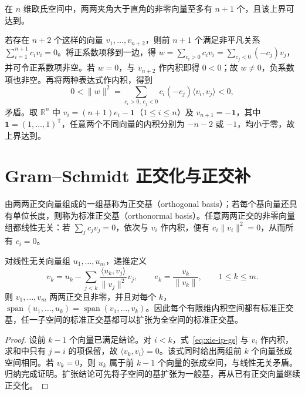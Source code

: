 \begin{example}
在 $n$ 维欧氏空间中，两两夹角大于直角的非零向量至多有 $n+1$ 个，且该上界可达到。
\end{example}
\begin{solve}
若存在 $n+2$ 个这样的向量 $v_1,\ldots,v_{n+2}$，则前 $n+1$ 个满足非平凡关系 $\sum_{i=1}^{n+1}c_iv_i=0$。将正系数项移到一边，得 $w=\sum_{c_i>0}c_iv_i=\sum_{c_j<0}(-c_j)v_j$，并可令正系数项非空。若 $w=0$，与 $v_{n+2}$ 作内积即得 $0<0$；故 $w\ne0$，负系数项也非空。再将两种表达式作内积，得到
\[
0<\|w\|^2=\sum_{c_i>0,\,c_j<0}c_i(-c_j)\langle v_i,v_j\rangle<0,
\]
矛盾。取 $\mathbb R^n$ 中 $v_i=(n+1)e_i-\boldsymbol1$（$1\leq i\leq n$）及 $v_{n+1}=-\boldsymbol1$，其中 $\boldsymbol1=(1,\ldots,1)^{\mathsf T}$，任意两个不同向量的内积分别为 $-n-2$ 或 $-1$，均小于零，故上界达到。
\end{solve}

\section{Gram--Schmidt 正交化与正交补}
\label{sec:xie-ip-orthogonalization}

\begin{definition}
由两两正交向量组成的一组基称为正交基（orthogonal basis）；若每个基向量还具有单位长度，则称为标准正交基（orthonormal basis）。任意两两正交的非零向量组都线性无关：若 $\sum_jc_jv_j=0$，依次与 $v_i$ 作内积，便有 $c_i\|v_i\|^2=0$，从而所有 $c_i=0$。
\end{definition}

\begin{theorem}
\label{thm:xie-ip-gs}
对线性无关向量组 $u_1,\ldots,u_m$，递推定义
\begin{equation}
\label{eq:xie-ip-gs}
v_k=u_k-\sum_{j<k}\frac{\langle u_k,v_j\rangle}{\|v_j\|^2}v_j,
\qquad e_k=\frac{v_k}{\|v_k\|},\qquad 1\leq k\leq m.
\end{equation}
则 $v_1,\ldots,v_m$ 两两正交且非零，并且对每个 $k$，$\operatorname{span}(u_1,\ldots,u_k)=\operatorname{span}(v_1,\ldots,v_k)$。因此每个有限维内积空间都有标准正交基，任一子空间的标准正交基都可以扩张为全空间的标准正交基。
\end{theorem}
\begin{proof}
设前 $k-1$ 个向量已满足结论。对 $i<k$，式~\eqref{eq:xie-ip-gs} 与 $v_i$ 作内积，求和中只有 $j=i$ 的项保留，故 $\langle v_k,v_i\rangle=0$。该式同时给出两组前 $k$ 个向量张成空间相同。若 $v_k=0$，则 $u_k$ 属于前 $k-1$ 个向量的张成空间，与线性无关矛盾。归纳完成证明。扩张结论可先将子空间的基扩张为一般基，再从已有正交向量继续正交化。
\end{proof}

